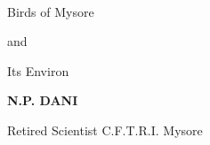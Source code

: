 ~\phantom{a}
\vfill

\thispagestyle{empty}

\begin{center}
{\Huge Birds of Mysore}\relax

\bigskip
{\Huge and}\relax

\smallskip
\bigskip
{\Huge Its Environ}\relax
\end{center}

\vfill

\begin{center}
{\bf N.P. DANI}

\smallskip
{Retired Scientist C.F.T.R.I. Mysore}
\end{center}
\newpage

